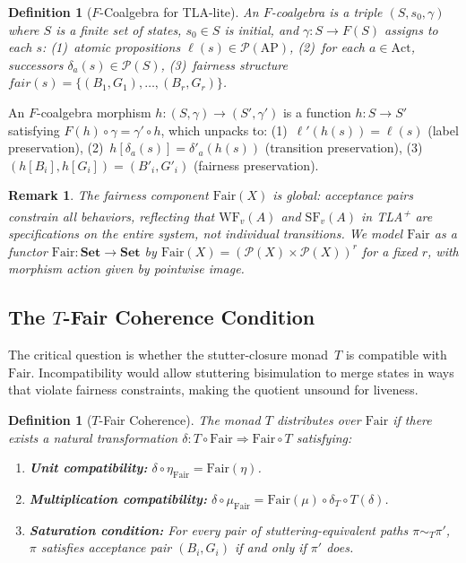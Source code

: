 \documentclass[11pt]{article}
\newtheorem{definition}[theorem]{Definition}
\newtheorem{remark}[theorem]{Remark}
\newcommand{\Set}{\mathbf{Set}}
\newcommand{\Pow}{\mathcal{P}}
\newcommand{\Fair}{\ensuremath{\mathrm{Fair}}}
\newcommand{\Act}{\ensuremath{\mathrm{Act}}}
\newcommand{\AP}{\ensuremath{\mathrm{AP}}}
\newcommand{\WF}{\ensuremath{\mathrm{WF}}}
\newcommand{\SF}{\ensuremath{\mathrm{SF}}}
\newcommand{\TFair}{$T$-Fair}
\newcommand{\TLAplus}{TLA\textsuperscript{+}}
\begin{document}
\begin{definition}[$F$-Coalgebra for TLA-lite]
\label{def:fcoalg}
An \emph{$F$-coalgebra} is a triple $(S, s_0, \gamma)$ where $S$ is a
finite set of states, $s_0 \in S$ is initial, and
$\gamma : S \to F(S)$ assigns to each $s$:
(1)~atomic propositions $\ell(s) \in \Pow(\AP)$,
(2)~for each $a \in \Act$, successors
$\delta_a(s) \in \Pow(S)$,
(3)~fairness structure
$\mathit{fair}(s) = \{(B_1, G_1), \ldots, (B_r, G_r)\}$.
\end{definition}

An $F$-coalgebra morphism $h : (S, \gamma) \to (S', \gamma')$ is a
function $h : S \to S'$ satisfying $F(h) \circ \gamma = \gamma' \circ h$,
which unpacks to: (1)~$\ell'(h(s)) = \ell(s)$ (label preservation),
(2)~$h[\delta_a(s)] = \delta'_a(h(s))$ (transition preservation),
(3)~$(h[B_i], h[G_i]) = (B'_i, G'_i)$ (fairness preservation).

\begin{remark}
The fairness component $\Fair(X)$ is \emph{global}: acceptance pairs
constrain all behaviors, reflecting that $\WF_v(A)$ and $\SF_v(A)$ in
\TLAplus{} are specifications on the entire system, not individual
transitions.
We model $\Fair$ as a functor $\Fair : \Set \to \Set$ by
$\Fair(X) = (\Pow(X) \times \Pow(X))^r$ for a fixed $r$, with morphism
action given by pointwise image.
\end{remark}

\subsection{The \TFair{} Coherence Condition}

The critical question is whether the stutter-closure monad~$T$ is
compatible with $\Fair$.
Incompatibility would allow stuttering bisimulation to merge states in
ways that violate fairness constraints, making the quotient unsound for
liveness.

\begin{definition}[\TFair{} Coherence]
\label{def:tfair}
The monad $T$ \emph{distributes over} $\Fair$ if there exists a natural
transformation $\delta : T \circ \Fair \Rightarrow \Fair \circ T$
satisfying:
\begin{enumerate}[nosep]
\item \textbf{Unit compatibility:}
  $\delta \circ \eta_{\Fair} = \Fair(\eta)$.
\item \textbf{Multiplication compatibility:}
  $\delta \circ \mu_{\Fair} = \Fair(\mu) \circ \delta_T \circ T(\delta)$.
\item \textbf{Saturation condition:} For every pair of
  stuttering-equivalent paths $\pi \sim_T \pi'$, $\pi$ satisfies
  acceptance pair $(B_i, G_i)$ if and only if $\pi'$ does.
\end{enumerate}
\end{definition}
\end{document}
